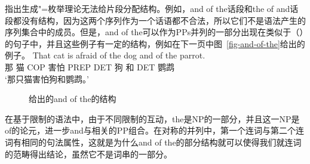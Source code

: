 \mbox{}\citet[\S~3.2]{PS2001a}指出生成"=枚举理论无法给片段分配结构。例如，and of the话段和the of and话段都没有结构，因为这两个序列作为一个话语都不合法，所以它们不是语法产生的序列集合中的成员。但是，and of the可以作为PPs并列的一部分出现在类似于（）的句子中，并且这些例子有一定的结构，例如在下一页中图~\vref{fig-and-of-the}给出的例子。
\ea
\gll That cat is afraid of the dog and of the parrot.\\
	 那 猫 COP 害怕 PREP DET 狗 和 DET 鹦鹉\\
\glt `那只猫害怕狗和鹦鹉。'
\z
\begin{figure}
\centering
{}
\caption{\label{fig-and-of-the}给出的and of the的结构}
\end{figure}%
在基于限制的语法中，由于不同限制的互动，the是NP的一部分，并且这一NP是of的论元，进一步and与相关的PP组合。在对称的并列中，第一个连词与第二个连词有相同的句法属性，这就是为什么and of the的部分结构就可以使得我们就连词的范畴得出结论，虽然它不是词串的一部分。

